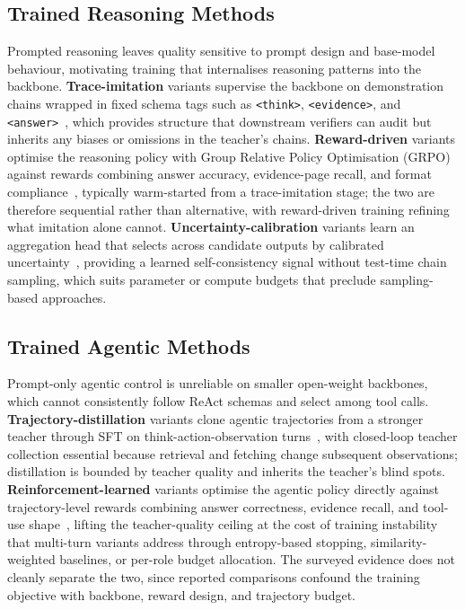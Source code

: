 \documentclass[11pt]{article}
\begin{document}
\subsection{Trained Reasoning Methods}
\label{sec:train-reasoning}
Prompted reasoning leaves quality sensitive to prompt design and base-model behaviour, motivating training that internalises reasoning patterns into the backbone. \textbf{Trace-imitation} variants supervise the backbone on demonstration chains wrapped in fixed schema tags such as \texttt{<think>}, \texttt{<evidence>}, and \texttt{<answer>}~\cite{yan2025docseeker, guo2026end}, which provides structure that downstream verifiers can audit but inherits any biases or omissions in the teacher's chains. \textbf{Reward-driven} variants optimise the reasoning policy with Group Relative Policy Optimisation (GRPO) against rewards combining answer accuracy, evidence-page recall, and format compliance~\cite{xiong2026docr1, xu2026mmr5}, typically warm-started from a trace-imitation stage; the two are therefore sequential rather than alternative, with reward-driven training refining what imitation alone cannot. \textbf{Uncertainty-calibration} variants learn an aggregation head that selects across candidate outputs by calibrated uncertainty~\cite{hannan2025docslm}, providing a learned self-consistency signal without test-time chain sampling, which suits parameter or compute budgets that preclude sampling-based approaches.

\subsection{Trained Agentic Methods}
\label{sec:train-agentic}
Prompt-only agentic control is unreliable on smaller open-weight backbones, which cannot consistently follow ReAct schemas and select among tool calls. \textbf{Trajectory-distillation} variants clone agentic trajectories from a stronger teacher through SFT on think-action-observation turns~\cite{zheng2026docvstar, zhang2026docdancer}, with closed-loop teacher collection essential because retrieval and fetching change subsequent observations; distillation is bounded by teacher quality and inherits the teacher's blind spots. \textbf{Reinforcement-learned} variants optimise the agentic policy directly against trajectory-level rewards combining answer correctness, evidence recall, and tool-use shape~\cite{wang2026vragrl, lin2026mmdocr1}, lifting the teacher-quality ceiling at the cost of training instability that multi-turn variants address through entropy-based stopping, similarity-weighted baselines, or per-role budget allocation. The surveyed evidence does not cleanly separate the two, since reported comparisons confound the training objective with backbone, reward design, and trajectory budget.
\end{document}
